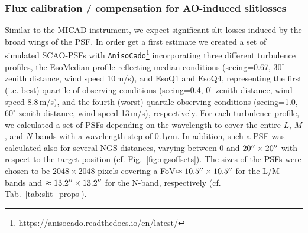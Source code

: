 \subsubsection{Flux calibration / compensation for AO-induced slitlosses}\label{ssec:aoslitloss}
Similar to the MICAD instrument, we expect significant slit losses induced by the broad wings of the \ac{PSF}. In order get a first estimate we created a set of simulated \ac{SCAO}-\ac{PSF}s with \texttt{AnisoCado}\footnote{\url{https://anisocado.readthedocs.io/en/latest/}} incorporating three different turbulence profiles, the EsoMedian profile reflecting median conditions (seeing=0.67\arcsec, $30^\circ$ zenith distance, wind speed 10\,m/s), and EsoQ1 and EsoQ4, representing the first (i.e. best) quartile of observing conditions (seeing=0.4\arcsec, $0^\circ$ zenith distance, wind speed 8.8\,m/s), and the fourth (worst) quartile observing conditions  (seeing=1.0\arcsec, $60^\circ$ zenith distance, wind speed 13\,m/s), respectively. For each turbulence profile, we calculated a set of \ac{PSF}s depending on the wavelength to cover the entire $L$, $M$, and $N$-bands with a wavelength step of 0.1$\mu$m. In addition, such a \ac{PSF} was calculated also for several \ac{NGS} distances, varying between 0 and $20\hbox{$^{\prime\prime}$}\times20\hbox{$^{\prime\prime}$}$ with respect to the target position (cf. Fig.~\ref{fig:ngsoffsets}). The sizes of the \ac{PSF}s were chosen to be $2048\times2048$ pixels covering a \ac{FoV}$\approx10.5\hbox{$^{\prime\prime}$}\times10.5\hbox{$^{\prime\prime}$}$ for the L/M bands and $\approx13.2\hbox{$^{\prime\prime}$}\times13.2\hbox{$^{\prime\prime}$}$ for the N-band, respectively (cf. Tab.~\ref{tab:slit_props}). \\

